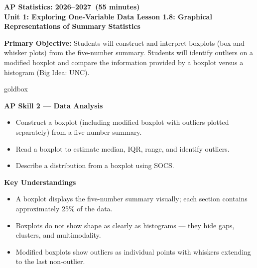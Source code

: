 \documentclass[10pt]{article}
\begin{document}
\def\CourseName{AP Statistics}
\def\SchoolYear{2026--2027}
\def\MeetingLength{55 minutes}
\def\UnitNumberName{Unit 1: Exploring One-Variable Data \quad}
\def\LessonNumberName{Lesson 1.8: Graphical Representations of Summary Statistics}

\begin{center}
    {\Large\bfseries \CourseName: \SchoolYear\ (\MeetingLength) \\
    {\small\bfseries \UnitNumberName \LessonNumberName}}
\end{center}

\begin{tcolorbox}[colback=sky,colframe=navy,boxrule=0.9pt,arc=2mm,
    left=2mm,right=2mm,top=1.5mm,bottom=1.5mm]
    \textbf{Primary Objective:} Students will construct and interpret boxplots (box-and-whisker
    plots) from the five-number summary. Students will identify outliers on a modified boxplot and
    compare the information provided by a boxplot versus a histogram (Big Idea: UNC).
\end{tcolorbox}

\begin{skillbox}{goldbox}
\begin{minipage}[t]{0.48\linewidth}
    \textbf{AP Skill 2 --- Data Analysis}
    \begin{itemize}
        \item Construct a boxplot (including modified boxplot with outliers plotted separately) from a five-number summary.
        \item Read a boxplot to estimate median, IQR, range, and identify outliers.
        \item Describe a distribution from a boxplot using SOCS.
    \end{itemize}
\end{minipage}
\hfill
\begin{minipage}[t]{0.48\linewidth}
    \textbf{Key Understandings}
    \begin{itemize}
        \item A boxplot displays the five-number summary visually; each section contains approximately 25\% of the data.
        \item Boxplots do not show shape as clearly as histograms --- they hide gaps, clusters, and multimodality.
        \item Modified boxplots show outliers as individual points with whiskers extending to the last non-outlier.
    \end{itemize}
\end{minipage}
\end{skillbox}
\end{document}
